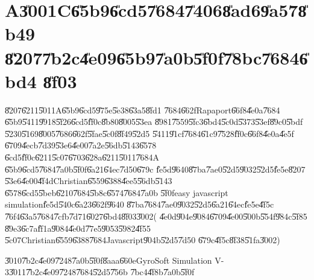 \bigskip

\section{A\U{3001}C\U{65b9}\U{6cd5}\U{7684}\U{7406}\U{8ad6}\U{9a57}\U{8b49}%
\U{8207}\U{7b2c}\U{4e09}\U{65b9}\U{7a0b}\U{5f0f}\U{78bc}\U{7684}\U{6bd4}%
\U{8f03}}

\U{8207}\U{6211}\U{5011}A\U{65b9}\U{6cd5}\U{975e}\U{5e38}\U{63a5}\U{8fd1}%
\U{7684}\U{662f}Rapaport\U{66f8}\U{4e0a}\cite[Page 232]{rapaport}\U{7684}%
\U{65b9}\U{5411}\U{9918}\U{5f26}\U{6cd5}\U{ff0c}\U{8b80}\U{8005}\U{53ea}%
\U{8981}\U{7559}\U{5fc3}\U{6bd4}\U{5c0d}\U{5373}\U{53ef}\U{89c0}\U{5bdf}%
\U{5230}\U{5169}\U{8005}\U{7686}\U{662f}\U{5fae}\U{5c0f}\U{8f49}\U{52d5}%
\U{5411}\U{91cf}\U{7684}\U{61c9}\U{7528}\U{ff0c}\U{66f8}\U{4e0a}\U{4e5f}%
\U{6709}\U{4ecb}\U{7d39}\U{53e6}\U{4e00}\U{7a2e}\U{56db}\U{5143}\U{6578}%
\U{6cd5}\U{ff0c}\U{6211}\U{5c07}\U{6703}\U{628a}\U{6211}\U{5011}\U{7684}A%
\U{65b9}\U{6cd5}\U{7684}\U{7a0b}\U{5f0f}\U{6a21}\U{64ec}\U{7d50}\U{679c}%
\U{fe5d}\U{9640}\U{87ba}\U{7ae0}\U{52d5}\U{9032}\U{52d5}\U{fe5e}\U{8207}%
\U{53e6}\U{4e00}\U{4f4d}Christian\U{6559}\U{6388}\U{4ee5}\U{56db}\U{5143}%
\U{6578}\U{6cd5}\U{5beb}\U{6210}\U{7684}\U{5b8c}\U{6574}\U{7684}\U{7a0b}%
\U{5f0f}easy javascript simulation\U{fe5d}\U{540c}\U{6a23}\U{662f}\U{9640}%
\U{87ba}\U{7684}\U{7ae0}\U{9032}\U{52d5}\U{6a21}\U{64ec}\U{fe5e}\U{4f5c}%
\U{76f4}\U{63a5}\U{7684}\U{7cfb}\U{7d71}\U{6027}\U{6bd4}\U{8f03}\U{3002}(%
\U{4e0d}\U{904e}\U{9084}\U{6709}\U{4e00}\U{500b}\U{554f}\U{984c}\U{5f85}%
\U{89e3}\U{6c7a}\U{ff1a}\U{9084}\U{4e0d}\U{77e5}\U{9053}\U{5982}\U{4f55}%
\U{5c07}Christian\U{6559}\U{6388}\U{7684}Javascript\U{904b}\U{52d5}\U{7d50}%
\U{679c}\U{4f5c}\U{8f38}\U{51fa}\U{3002})

\bigskip

\U{3010}\U{7b2c}\U{4e09}\U{7248}\U{7a0b}\U{5f0f}\U{8aaa}\U{660e}GyroSoft
Simulation V-3\U{3011}\U{7b2c}\U{4e09}\U{7248}\U{7684}\U{52d5}\U{756b}%
\U{7bc4}\U{4f8b}\U{7a0b}\U{5f0f}

\begin{mdframed}[leftline=false, rightline=false,backgroundcolor=bg]
\inputminted[linenos,fontsize=\footnotesize]{python}{../../Scripts/cordtrans/opengltest/cubegyro_opengl_animation_1.py}
\end{mdframed}%

